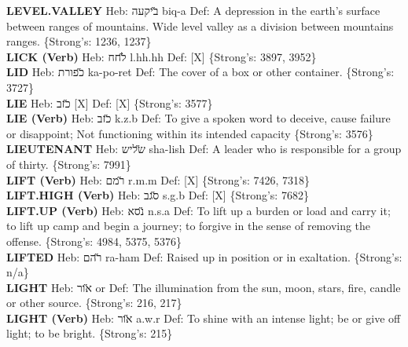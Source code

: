 {\textbf{LEVEL.VALLEY} Heb: {\large\H ביקעה} biq-a Def: A depression in the earth’s surface between ranges of mountains. Wide level valley as a division between mountains ranges. \{Strong's: 1236, 1237\}\hfill{}\\

\textbf{LICK (Verb)} Heb: {\large\H לחח} l.hh.hh Def: {[}X{]} \{Strong's: 3897, 3952\}\hfill{}\\

\textbf{LID} Heb: {\large\H כפורת} ka-po-ret Def: The cover of a box or other container. \{Strong's: 3727\}\hfill{}\\

\textbf{LIE} Heb: {\large\H כזב} {[}X{]} Def: {[}X{]} \{Strong's: 3577\}\hfill{}\\

\textbf{LIE (Verb)} Heb: {\large\H כזב} k.z.b Def: To give a spoken word to deceive, cause failure or disappoint; Not functioning within its intended capacity \{Strong's: 3576\}\hfill{}\\

\textbf{LIEUTENANT} Heb: {\large\H שליש} sha-lish Def: A leader who is responsible for a group of thirty. \{Strong's: 7991\}\hfill{}\\

\textbf{LIFT (Verb)} Heb: {\large\H רמם} r.m.m Def: {[}X{]} \{Strong's: 7426, 7318\}\hfill{}\\

\textbf{LIFT.HIGH (Verb)} Heb: {\large\H סגב} s.g.b Def: {[}X{]} \{Strong's: 7682\}\hfill{}\\

\textbf{LIFT.UP (Verb)} Heb: {\large\H נסא} n.s.a Def: To lift up a burden or load and carry it; to lift up camp and begin a journey; to forgive in the sense of removing the offense. \{Strong's: 4984, 5375, 5376\}\hfill{}\\

\textbf{LIFTED} Heb: {\large\H רהם} ra-ham Def: Raised up in position or in exaltation. \{Strong's: n/a\}\hfill{}\\

\textbf{LIGHT} Heb: {\large\H אור} or Def: The illumination from the sun, moon, stars, fire, candle or other source. \{Strong's: 216, 217\}\hfill{}\\

\textbf{LIGHT (Verb)} Heb: {\large\H אור} a.w.r Def: To shine with an intense light; be or give off light; to be bright. \{Strong's: 215\}\hfill{}\\

}
